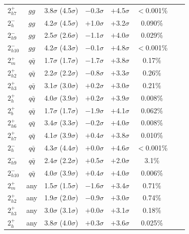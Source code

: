 \begin{table}
{\begin{tabular}{lccccccc}
$2^+_{h7}$ & $gg$         & 3.8$\sigma$ (4.5$\sigma$) & $-$0.3$\sigma$ & $+$4.5$\sigma$ & $<$0.001\%  \\
 $2^-_{h}$~\cite{Chatrchyan:2013mxa}     & $gg$       &  4.2$\sigma$ (4.5$\sigma$)  & +1.0$\sigma$    & +3.2$\sigma$  &  0.090\%  \\
$2^-_{h9}$ & $gg$          & 2.5$\sigma$ (2.6$\sigma$) & $-$1.1$\sigma$ & $+$4.0$\sigma$ & 0.029\%  \\
$2^-_{h10}$ & $gg$         & 4.2$\sigma$ (4.3$\sigma$) & $-$0.1$\sigma$ & $+$4.8$\sigma$ & $<$0.001\%  \\
\hline
$2_{m}^+$~\cite{Chatrchyan:2013mxa}     & $q\bar{q}$       &  1.7$\sigma$ (1.7$\sigma$)  & $-$1.7$\sigma$  & +3.8$\sigma$  &  0.17\% \\
$2^+_{h2}$ & $q\bar{q}$ & 2.2$\sigma$ (2.2$\sigma$) & $-$0.8$\sigma$ & $+$3.3$\sigma$ & 0.26\% \\
$2^+_{h3}$ & $q\bar{q}$ & 3.1$\sigma$ (3.0$\sigma$) & $+$0.2$\sigma$ & $+$3.0$\sigma$ & 0.21\% \\
$2^+_{h}$  & $q\bar{q}$ & 4.0$\sigma$ (3.9$\sigma$) & $+$0.2$\sigma$ & $+$3.9$\sigma$ & 0.008\%  \\
$2^+_{b}$  & $q\bar{q}$ & 1.7$\sigma$ (1.7$\sigma$) & $-$1.9$\sigma$ & $+$4.1$\sigma$ & 0.062\%  \\
$2^+_{h6}$ & $q\bar{q}$ & 3.4$\sigma$ (3.3$\sigma$) & $-$0.2$\sigma$ & $+$4.0$\sigma$ & 0.008\%  \\
$2^+_{h7}$ & $q\bar{q}$ & 4.1$\sigma$ (3.9$\sigma$) & $+$0.4$\sigma$ & $+$3.8$\sigma$ & 0.010\%  \\
$2^-_{h}$  & $q\bar{q}$  & 4.3$\sigma$ (4.4$\sigma$) & $+$0.0$\sigma$ & $+$4.6$\sigma$ & $<$0.001\% \\
$2^-_{h9}$ & $q\bar{q}$  & 2.4$\sigma$ (2.2$\sigma$) & $+$0.5$\sigma$ & $+$2.0$\sigma$ & 3.1\%  \\
$2^-_{h10}$ & $q\bar{q}$ & 4.0$\sigma$ (3.9$\sigma$) & $+$0.4$\sigma$ & $+$4.0$\sigma$ & 0.006\%  \\
\hline
$2_{m}^+$~\cite{Chatrchyan:2013mxa}      & any                   &  1.5$\sigma$ (1.5$\sigma$)  & $-$1.6$\sigma$  & +3.4$\sigma$  &  0.71\% \\
$2^+_{h2}$ & any                                 & 1.9$\sigma$ (2.0$\sigma$) & $-$0.9$\sigma$ & $+$3.0$\sigma$ & 0.74\%  \\
$2^+_{h3}$ & any                                 & 3.0$\sigma$ (3.1$\sigma$) & $+$0.0$\sigma$ & $+$3.1$\sigma$ & 0.18\%  \\
$2^+_{h}$  & any                                 & 3.8$\sigma$ (4.0$\sigma$) & $+$0.3$\sigma$ & $+$3.6$\sigma$ & 0.025\%  \\

\end{tabular}}
\end{table}
